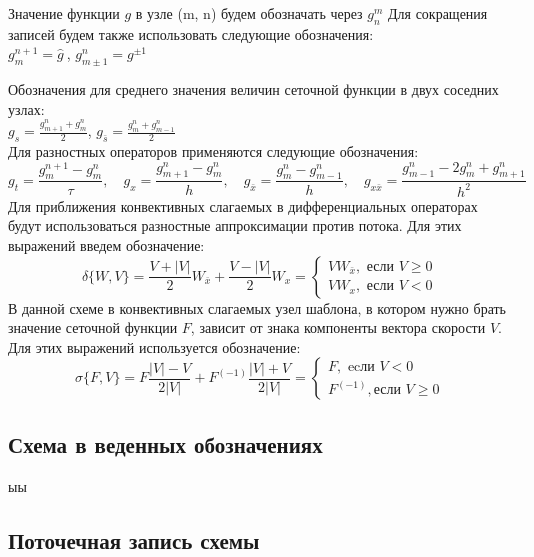 \documentclass[12pt]{article}
\begin{document}
\begin{center}
Значение функции $g$ в узле (m, n) будем обозначать через $g_{n}^{m}$
Для сокращения записей будем также использовать следующие обозначения:
\\
$
g_{m}^{n+1} = \hat g \
$,
$
g_{m \pm 1} ^{n} = g^{\pm 1}
$

Обозначения для среднего значения величин сеточной функции в двух соседних узлах: \\
$
g_{s} = \frac{g_{m+1}^{n} + g_{m}^{n}}{2}
$,
$
g_{\bar s} = \frac {g_{m}^{n} + g_{m-1}^{n}}{2}
$
\\
Для разностных операторов применяются следующие обозначения:
\\
$$
g_{t}=\frac{g_{m}^{n+1}-g_{m}^{n}}{\tau}, \quad g_{x}=\frac{g_{m+1}^{n}-g_{m}^{n}}{h},  \quad g_{\bar{x}}=\frac{g_{m}^{n}-g_{m-1}^{n}}{h}, \quad g_{x \bar{x}}=\frac{g_{m-1}^{n}-2 g_{m}^{n}+g_{m+1}^{n}}{h^{2}}
$$
Для приближения конвективных слагаемых в дифференциальных операторах будут использоваться разностные аппроксимации 
против потока. Для этих выражений введем обозначение:
$$
\delta\{W, V\}=\frac{V+|V|}{2} W_{\bar{x}}+\frac{V-|V|}{2} W_{x}=\left\{\begin{array}{l}
V W_{\bar{x}}, \text { если } V \geq 0 \\
V W_{x}, \text { если } V<0
\end{array}\right.
$$
В данной схеме в конвективных слагаемых узел шаблона, в котором нужно брать значение сеточной функции $F$,
 зависит от знака компоненты вектора скорости $V$. Для этих выражений используется обозначение:
$$
\sigma\{F, V\}=F \frac{|V|-V}{2|V|}+F^{(-1)} \frac{|V|+V}{2|V|}=\left\{\begin{array}{l}
F, \text { ecли } V<0 \\
F^{(-1)}, \text {если } V \geq 0
\end{array}\right.
$$

\subsection{Схема в веденных обозначениях}
ыы
\subsection{Поточечная запись схемы}
\end{center}
\end{document}

